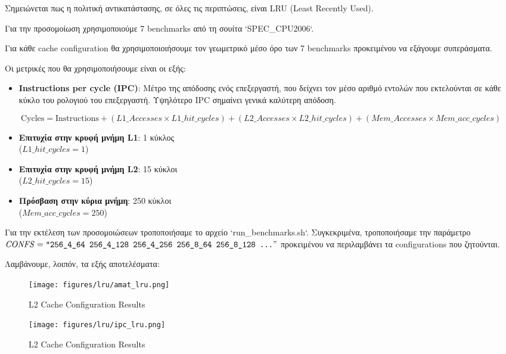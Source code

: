 \documentclass{article}
\begin{document}
Σημειώνεται πως η πολιτική αντικατάστασης, σε όλες τις περιπτώσεις, είναι LRU (Least Recently Used).

Για την προσομοίωση χρησιμοποιούμε 7 benchmarks από τη σουίτα `SPEC\_CPU2006`. 

Για κάθε cache configuration θα χρησιμοποιοιήσουμε τον γεωμετρικό μέσο όρο των 7 benchmarks προκειμένου να εξάγουμε συπεράσματα.

Οι μετρικές που θα χρησιμοποιήσουμε είναι οι εξής:
\begin{itemize}
    \item \textbf{Instructions per cycle (IPC)}: Μέτρο της απόδοσης ενός επεξεργαστή, που δείχνει τον μέσο αριθμό εντολών που εκτελούνται σε κάθε κύκλο του ρολογιού του επεξεργαστή. Υψηλότερο IPC σημαίνει γενικά καλύτερη απόδοση.
\end{itemize}




\[
\text{Cycles} = \text{Instructions} + (\mathit{L1\_Accesses} \times \mathit{L1\_hit\_cycles}) + (\mathit{L2\_Accesses} \times \mathit{L2\_hit\_cycles}) + (\mathit{Mem\_Accesses} \times \mathit{Mem\_acc\_cycles})
\]


\begin{itemize}
\item \textbf{Επιτυχία στην κρυφή μνήμη L1}: 1 κύκλος\\
(\( \mathit{L1\_hit\_cycles} = 1 \))
\item \textbf{Επιτυχία στην κρυφή μνήμη L2}: 15 κύκλοι\\
(\( \mathit{L2\_hit\_cycles} = 15 \))
\item \textbf{Πρόσβαση στην κύρια μνήμη}: 250 κύκλοι\\
(\( \mathit{Mem\_acc\_cycles} = 250 \))
\end{itemize}

Για την εκτέλεση των προσομοιώσεων τροποποιήσαμε το αρχείο `run\_benchmarks.sh`.
Συγκεκριμένα, τροποποιήσαμε την παράμετρο
$\mathit{CONFS} = \texttt{"256\_4\_64 256\_4\_128 256\_4\_256 256\_8\_64 256\_8\_128 \dots}"$ 
προκειμένου να περιλαμβάνει τα configurations που ζητούνται.

Λαμβάνουμε, λοιπόν, τα εξής αποτελέσματα:

\begin{figure}[H]
    \centering
    \texttt{[image: figures/lru/amat\_lru.png]}
    \caption{L2 Cache Configuration Results}
    \label{fig:l2cache}
\end{figure}

\begin{figure}[H]
    \centering
    \texttt{[image: figures/lru/ipc\_lru.png]}
    \caption{L2 Cache Configuration Results}
    \label{fig:l2cache}
\end{figure}
\end{document}
